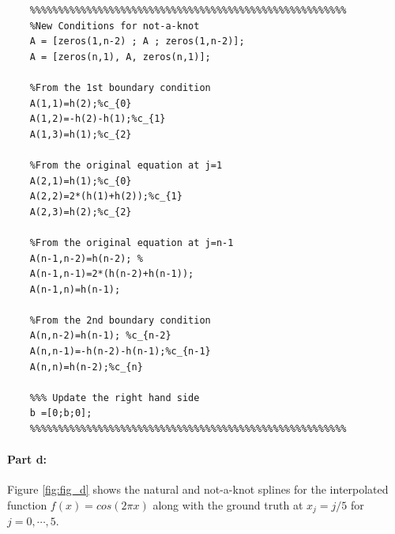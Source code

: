 \begin{lstlisting}
	%%%%%%%%%%%%%%%%%%%%%%%%%%%%%%%%%%%%%%%%%%%%%%%%%%%%%%%%
    %New Conditions for not-a-knot
    A = [zeros(1,n-2) ; A ; zeros(1,n-2)];
    A = [zeros(n,1), A, zeros(n,1)];  
    
    %From the 1st boundary condition 
    A(1,1)=h(2);%c_{0}
    A(1,2)=-h(2)-h(1);%c_{1}
    A(1,3)=h(1);%c_{2}
    
    %From the original equation at j=1
    A(2,1)=h(1);%c_{0}
    A(2,2)=2*(h(1)+h(2));%c_{1}
    A(2,3)=h(2);%c_{2}
    
    %From the original equation at j=n-1
    A(n-1,n-2)=h(n-2); %
    A(n-1,n-1)=2*(h(n-2)+h(n-1));
    A(n-1,n)=h(n-1);
    
    %From the 2nd boundary condition 
    A(n,n-2)=h(n-1); %c_{n-2}
    A(n,n-1)=-h(n-2)-h(n-1);%c_{n-1}
    A(n,n)=h(n-2);%c_{n}
    
    %%% Update the right hand side 
    b =[0;b;0];
    %%%%%%%%%%%%%%%%%%%%%%%%%%%%%%%%%%%%%%%%%%%%%%%%%%%%%%%%
\end{lstlisting}




\paragraph{Part d:}
Figure \ref{fig:fig_d} shows the natural and not-a-knot splines for the interpolated function $f(x)=cos(2\pi x)$ along with the ground truth at $x_{j}=j/5$ for $j=0, \cdots, 5$. 

